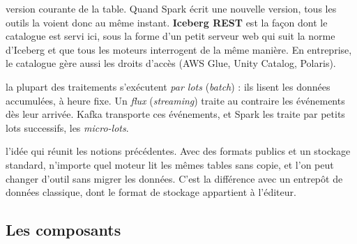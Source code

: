 \begin{description}[leftmargin=1.4em,labelindent=0pt,itemsep=4pt,font=\normalfont\bfseries]
  version courante de la table. Quand Spark écrit une nouvelle version, tous les outils la voient
  donc au même instant. \textbf{Iceberg REST} est la façon dont le catalogue est servi ici, sous la
  forme d'un petit serveur web qui suit la norme d'Iceberg et que tous les moteurs interrogent de la
  même manière.
  En entreprise, le catalogue gère aussi les droits d'accès (AWS Glue, Unity Catalog, Polaris).
\item[Lots et flux :] la plupart des traitements s'exécutent \emph{par lots} (\emph{batch}) : ils
  lisent les données accumulées, à heure fixe. Un \emph{flux} (\emph{streaming}) traite au contraire
  les événements dès leur arrivée. Kafka transporte ces événements, et Spark les traite par petits
  lots successifs, les \emph{micro-lots}.
\item[Lakehouse ouvert :] l'idée qui réunit les notions précédentes. Avec des formats publics et
  un stockage standard, n'importe quel moteur lit les mêmes tables sans copie, et l'on peut changer
  d'outil sans migrer les données. C'est la différence avec un entrepôt de données classique, dont le
  format de stockage appartient à l'éditeur.
\end{description}

\subsection*{Les composants}

